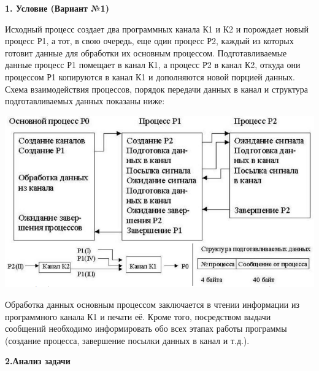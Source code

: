 \documentclass[a4paper,12pt]{article} %
\begin{document}
\newpage
\begin{Large}
\textbf{1. Условие (Вариант №1)}\\
\end{Large}
	Исходный процесс создает два программных канала К1 и К2 и порождает
новый процесс Р1, а тот, в свою очередь, еще один процесс Р2, каждый из которых
готовит данные для обработки их основным процессом. Подготавливаемые данные
процесс Р1 помещает в канал К1, а процесс Р2 в канал К2, откуда они процессом Р1
копируются в канал К1 и дополняются новой порцией данных. Схема
взаимодействия процессов, порядок передачи данных в канал и структура
подготавливаемых данных показаны ниже:\\
\begin{center}
\includegraphics[width=1.0\linewidth]{cond.png}
\end{center}
	Обработка данных основным процессом заключается в чтении информации из
программного канала К1 и печати её. Кроме того, посредством выдачи сообщений
необходимо информировать обо всех этапах работы программы (создание процесса,
завершение посылки данных в канал и т.д.).

\newpage
\begin{Large}
\textbf{2.Анализ задачи}\\
\end{Large}
\end{document}
